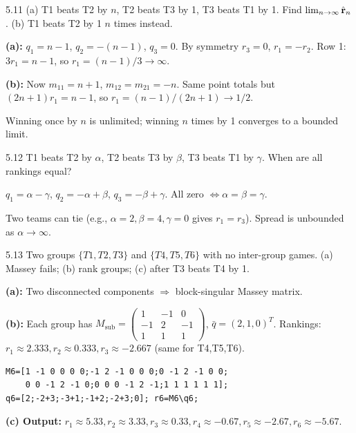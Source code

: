 \begin{exercise}{5.11}
(a) T1 beats T2 by $n$, T2 beats T3 by 1, T3 beats T1 by 1. Find $\lim_{n\to\infty}\hat{\mathbf{r}}_n$. (b) T1 beats T2 by 1 $n$ times instead.
\end{exercise}
\begin{solution}
\textbf{(a):} $q_1=n-1$, $q_2=-(n-1)$, $q_3=0$. By symmetry $r_3=0$, $r_1=-r_2$. Row 1: $3r_1=n-1$, so $r_1=(n-1)/3\to\infty$.

\textbf{(b):} Now $m_{11}=n+1$, $m_{12}=m_{21}=-n$. Same point totals but $(2n+1)r_1=n-1$, so $r_1=(n-1)/(2n+1)\to 1/2$.

Winning once by $n$ is unlimited; winning $n$ times by 1 converges to a bounded limit.
\end{solution}

\begin{exercise}{5.12}
T1 beats T2 by $\alpha$, T2 beats T3 by $\beta$, T3 beats T1 by $\gamma$. When are all rankings equal?
\end{exercise}
\begin{solution}
$q_1=\alpha-\gamma$, $q_2=-\alpha+\beta$, $q_3=-\beta+\gamma$. All zero $\Leftrightarrow \alpha=\beta=\gamma$.

Two teams can tie (e.g., $\alpha=2,\beta=4,\gamma=0$ gives $r_1=r_3$). Spread is unbounded as $\alpha\to\infty$.
\end{solution}

\begin{exercise}{5.13}
Two groups $\{T1,T2,T3\}$ and $\{T4,T5,T6\}$ with no inter-group games. (a) Massey fails; (b) rank groups; (c) after T3 beats T4 by 1.
\end{exercise}
\begin{solution}
\textbf{(a):} Two disconnected components $\Rightarrow$ block-singular Massey matrix.

\textbf{(b):} Each group has $M_{\text{sub}}=\begin{pmatrix}1&-1&0\\-1&2&-1\\1&1&1\end{pmatrix}$, $\bar{q}=(2,1,0)^T$.
Rankings: $r_1\approx2.333,r_2\approx0.333,r_3\approx-2.667$ (same for T4,T5,T6).
\begin{lstlisting}
M6=[1 -1 0 0 0 0;-1 2 -1 0 0 0;0 -1 2 -1 0 0;
    0 0 -1 2 -1 0;0 0 0 -1 2 -1;1 1 1 1 1 1];
q6=[2;-2+3;-3+1;-1+2;-2+3;0]; r6=M6\q6;
\end{lstlisting}
\textbf{(c) Output:} $r_1\approx5.33,r_2\approx3.33,r_3\approx0.33,r_4\approx-0.67,r_5\approx-2.67,r_6\approx-5.67$.
\end{solution}

